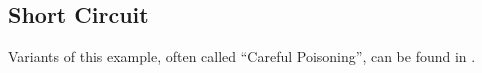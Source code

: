 \documentclass[11pt,a4paper]{book}
\theoremstyle{definition}
\theoremstyle{definition}
\theoremstyle{definition}
\theoremstyle{remark}
\begin{document}
\subsection{Short Circuit }

%

Variants of this example, often called ``Careful Poisoning'', can be found in \parencite{baumgartner2013regularity,halpern2015graded,weslake2015partial,beckers2018principled,blanchard2017cause}.
\end{document}
